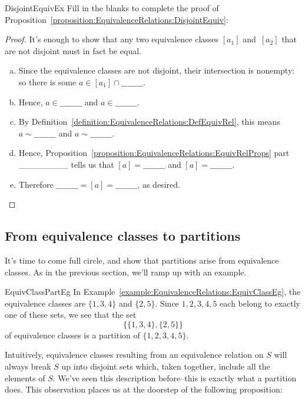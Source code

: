 \begin{exercise}{DisjointEquivEx}
Fill in the blanks to complete the proof of Proposition~\ref{proposition:EquivalenceRelations:DisjointEquiv}:

\begin{proof}
It's enough to show that any two equivalence classes $[a_1]$ and~$[a_2]$ that are not disjoint must in fact be equal. 
\begin{enumerate}[(a)]
\item
Since the equivalence classes are not disjoint, their intersection is nonempty: so there is some $a \in [a_1] \cap \_\_\_\_\_\_\_\_$. 
\item
Hence, $a \in \_\_\_\_\_\_\_\_$ and $a \in \_\_\_\_\_\_\_\_$. 
\item
By Definition~\ref{definition:EquivalenceRelations:DefEquivRel}, this means $a \sim \_\_\_\_\_\_\_\_$ and $a \sim \_\_\_\_\_\_\_\_$. 
\item
Hence, Proposition~\ref{proposition:EquivalenceRelations:EquivRelProps} part \_\_\_\_\_\_\_\_  tells us that $[a] =\_\_\_\_\_\_\_\_$ and $[a] =\_\_\_\_\_\_\_\_$. 
\item
Therefore $\_\_\_\_\_\_\_\_ = [a] = \_\_\_\_\_\_\_\_$, as desired.
\end{enumerate}
\end{proof}
\end{exercise}

\subsection{From equivalence classes to partitions}
\label{subsec:EquivalenceRelations:ObtainingPartitions:ClassToPartition}

It's time to come full circle, and show that partitions arise from equivalence classes. As in the previous section, we'll ramp up with an example.

\begin{example}{EquivClassPartEg}
In Example~\ref{example:EquivalenceRelations:EquivClassEg}, the equivalence classes are $\{1,3,4\}$ and $\{2,5\}$. Since $1,2,3,4,5$ each belong to exactly one of these sets, we see that the set
	$$ \bigl\{ \{1,3,4\}, \{2,5\} \bigr\} $$
of equivalence classes is a partition of $\{1,2, 3,4,5\}$.
\end{example}

Intuitively, equivalence classes resulting from an equivalence relation on $S$ will always break $S$ up into disjoint sets which, taken together, include all the elements of $S$. We've seen this description before--this is exactly what a partition does. This observation places us at the doorstep of the following proposition:

